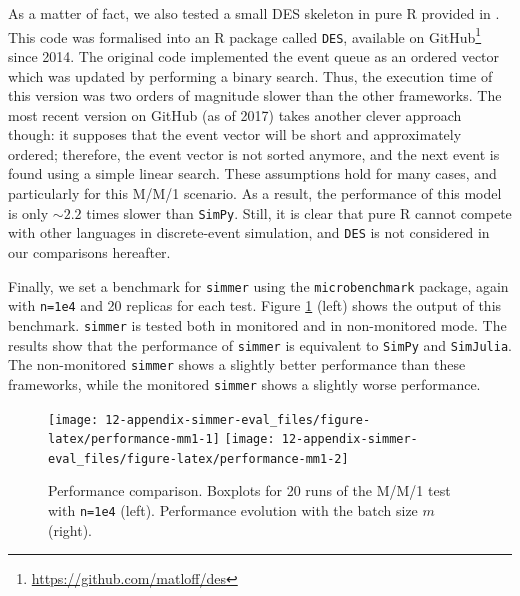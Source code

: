 \documentclass[twoside,nohyper]{tufte-book}
\theoremstyle{definition}
\theoremstyle{definition}
\theoremstyle{definition}
\theoremstyle{remark}
\begin{document}
As a matter of fact, we also tested a small DES skeleton in pure R
provided in \citet[s. 7.8.3]{Matloff:2011:ARP:2090080}. This code was
formalised into an R package called \texttt{DES}, available on
GitHub\footnote{\url{https://github.com/matloff/des}} since 2014. The
original code implemented the event queue as an ordered vector which was
updated by performing a binary search. Thus, the execution time of this
version was two orders of magnitude slower than the other frameworks.
The most recent version on GitHub (as of 2017) takes another clever
approach though: it supposes that the event vector will be short and
approximately ordered; therefore, the event vector is not sorted
anymore, and the next event is found using a simple linear search. These
assumptions hold for many cases, and particularly for this M/M/1
scenario. As a result, the performance of this model is only \(\sim2.2\)
times slower than \texttt{SimPy}. Still, it is clear that pure R cannot
compete with other languages in discrete-event simulation, and
\texttt{DES} is not considered in our comparisons hereafter.

Finally, we set a benchmark for \texttt{simmer} using the
\texttt{microbenchmark}
package\cite[0pt]{CRAN:microbenchmark},
again with \texttt{n=1e4} and 20 replicas for each test. Figure
\ref{fig:performance-mm1} (left) shows the output of this benchmark.
\texttt{simmer} is tested both in monitored and in non-monitored mode.
The results show that the performance of \texttt{simmer} is equivalent
to \texttt{SimPy} and \texttt{SimJulia}. The non-monitored
\texttt{simmer} shows a slightly better performance than these
frameworks, while the monitored \texttt{simmer} shows a slightly worse
performance.





\begin{figure}

{\centering \texttt{[image: 12-appendix-simmer-eval\_files/figure-latex/performance-mm1-1]} \texttt{[image: 12-appendix-simmer-eval\_files/figure-latex/performance-mm1-2]} 

}

\caption[Performance comparison. Boxplots for 20 runs of
the M/M/1 test with \texttt{n=1e4} (left). Performance evolution with
the batch size \(m\) (right).]{Performance comparison. Boxplots for 20 runs of
the M/M/1 test with \texttt{n=1e4} (left). Performance evolution with
the batch size \(m\) (right).}\label{fig:performance-mm1}
\end{figure}
\end{document}
